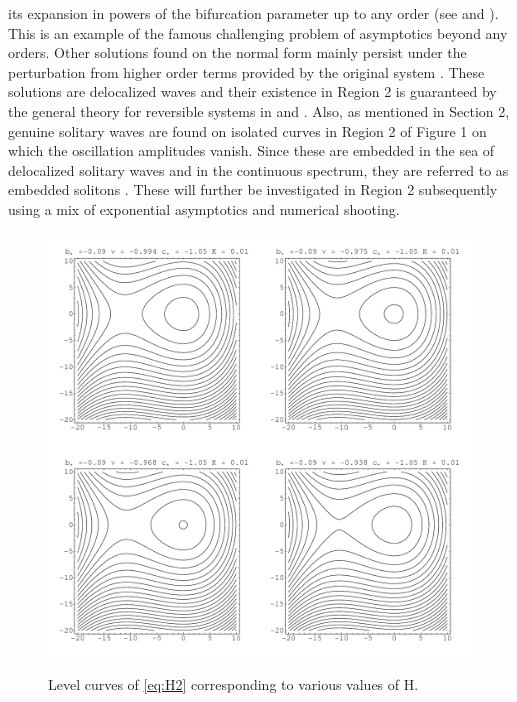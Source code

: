 its expansion in powers of the bifurcation parameter up to any order (see
\cite{Lombardi1} and \cite{Lombardi2}). This is an example of the famous
challenging problem of asymptotics beyond any orders. Other solutions found on
the normal form mainly persist under the perturbation from higher order terms
provided by the original system \cite{IK}. These solutions are delocalized
waves and their existence in Region 2 is guaranteed by the general theory for
reversible systems in \cite{Lombardi1} and \cite{Lombardi2}. Also, as mentioned
in Section 2, genuine solitary waves are found on isolated curves in Region 2
of Figure 1 on which the oscillation amplitudes vanish. Since these are
embedded in the sea of delocalized solitary waves and in the continuous
spectrum, they are referred to as embedded solitons \cite{CMYK}. These will
further be investigated in Region 2 subsequently using a mix of exponential
asymptotics and numerical shooting.

\begin{figure}[hh]
\begin{center}
\label{fig:homoclinic3}
\includegraphics[width=1.0\textwidth]{figures/figure3-1a}  
\caption{Level curves of \eqref{eq:H2} corresponding to various values of H.}
\end{center}
\end{figure}
